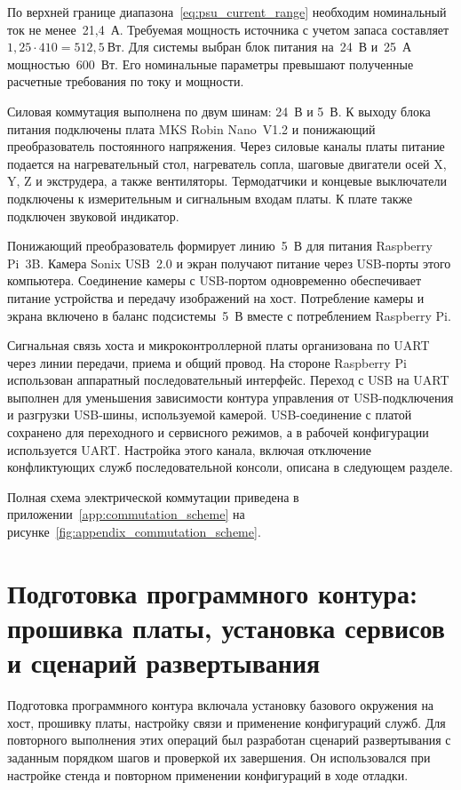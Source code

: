 По верхней границе диапазона~\eqref{eq:psu_current_range} необходим номинальный ток не менее~21,4~А. Требуемая мощность источника с учетом запаса составляет \(1{,}25 \cdot 410 = 512{,}5~\text{Вт}\). Для системы выбран блок питания на~24~В и~25~А мощностью~600~Вт. Его номинальные параметры превышают полученные расчетные требования по току и мощности.

Силовая коммутация выполнена по двум шинам: 24~В и 5~В. К выходу блока питания подключены плата MKS Robin Nano~V1.2 и понижающий преобразователь постоянного напряжения. Через силовые каналы платы питание подается на нагревательный стол, нагреватель сопла, шаговые двигатели осей X, Y, Z и экструдера, а также вентиляторы. Термодатчики и концевые выключатели подключены к измерительным и сигнальным входам платы. К плате также подключен звуковой индикатор.

Понижающий преобразователь формирует линию~5~В для питания Raspberry Pi~3B. Камера Sonix USB~2.0 и экран получают питание через USB-порты этого компьютера. Соединение камеры с USB-портом одновременно обеспечивает питание устройства и передачу изображений на хост. Потребление камеры и экрана включено в баланс подсистемы~5~В вместе с потреблением Raspberry Pi.

Сигнальная связь хоста и микроконтроллерной платы организована по UART через линии передачи, приема и общий провод. На стороне Raspberry Pi использован аппаратный последовательный интерфейс. Переход с USB на UART выполнен для уменьшения зависимости контура управления от USB-подключения и разгрузки USB-шины, используемой камерой. USB-соединение с платой сохранено для переходного и сервисного режимов, а в рабочей конфигурации используется UART. Настройка этого канала, включая отключение конфликтующих служб последовательной консоли, описана в следующем разделе.

Полная схема электрической коммутации приведена в приложении~\ref{app:commutation_scheme} на рисунке~\ref{fig:appendix_commutation_scheme}.

\section{Подготовка программного контура: прошивка платы, установка сервисов и сценарий развертывания}

Подготовка программного контура включала установку базового окружения на хост, прошивку платы, настройку связи и применение конфигураций служб. Для повторного выполнения этих операций был разработан сценарий развертывания с заданным порядком шагов и проверкой их завершения. Он использовался при настройке стенда и повторном применении конфигураций в ходе отладки.

